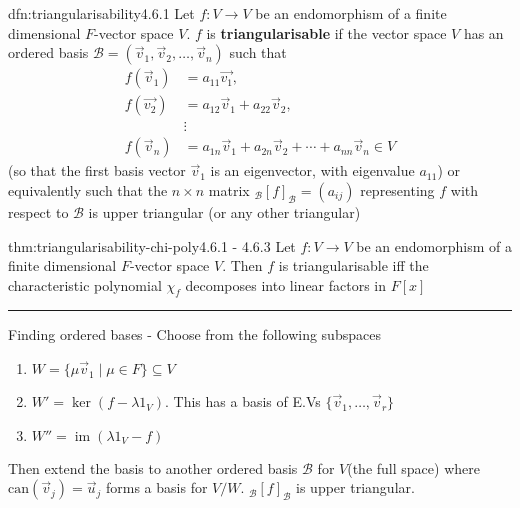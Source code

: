 \documentclass[landscape, 8pt]{extarticle}
\DeclareMathOperator{\im}{im}
\begin{document}
\begin{multicols}{3}
\begin{dfn}[Triangularisability]{dfn:triangularisability}{4.6.1}
    Let $f : V \to V$ be an endomorphism of a finite dimensional $F$-vector space $V$. $f$ is \textbf{triangularisable} if the vector space $V$ has an ordered basis $\mathcal{B} = (\vec{v}_{1}, \vec{v}_{2},\dots,\vec{v}_{n})$ such that
        \begin{align*}
            f(\vec{v}_{1}) &= a_{11}\vec{v_{1}}, \\
            f(\vec{v_{2}}) &= a_{12}\vec{v}_{1} + a_{22}\vec{v}_{2}, \\
            &\vdots \\
            f(\vec{v}_{n}) &= a_{1n}\vec{v}_{1} + a_{2n}\vec{v}_{2} + \cdots + a_{nn}\vec{v}_{n}\in V
        \end{align*}
        (so that the first basis vector $\vec{v}_{1}$ is an eigenvector, with eigenvalue $a_{11}$) or equivalently such that the $n \times n$ matrix $_{\mathcal{B}}[f]_{\mathcal{B}} = (a_{ij})$ representing $f$ with respect to $\mathcal{B}$ is upper triangular (or any other triangular)
\end{dfn}


\begin{thm}[]{thm:triangularisability-chi-poly}{4.6.1 - 4.6.3}
    Let $f : V \to V$ be an endomorphism of a finite dimensional $F$-vector space $V$. Then $f$ is triangularisable iff the characteristic polynomial $\chi_{f}$ decomposes into linear factors in $F[x]$

    \noindent\rule{\textwidth}{0.2pt}
    Finding ordered bases - Choose from the following subspaces
    \begin{enumerate}
        \setlength\itemsep{0em}
        \item $W = \{\mu \vec{v}_{1} \mid \mu\in F\}\subseteq V$
        \item $W' = \ker(f - \lambda 1_{V})$. This has a basis of E.Vs $\{\vec{v}_{1},\dots,\vec{v}_{r}\}$
        \item $W'' = \im (\lambda 1_{V} - f)$
    \end{enumerate}
    Then extend the basis to another ordered basis $\mathcal{B}$ for $V$(the full space) where $\text{can}(\vec{v}_{j}) = \vec{u}_{j}$ forms a basis for $V / W$. ${}_{\mathcal{B}}[f]_{\mathcal{B}}$ is upper triangular.


\end{thm}
\end{multicols}
\end{document}
